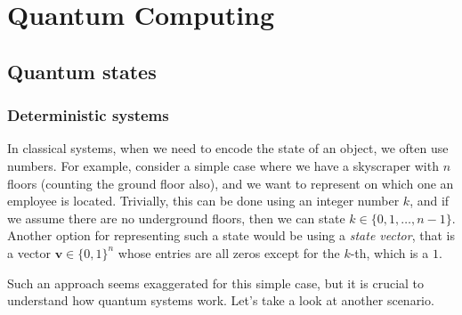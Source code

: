 \documentclass[12pt,a4paper]{report}
\theoremstyle{definition}
\theoremstyle{definition}
\theoremstyle{definition}
\begin{document}
\chapter{Quantum Computing}


\section{Quantum states}
\subsection{Deterministic systems}
In classical systems, when we need to encode the state of an object, we often use numbers. For example, consider a simple case where we have a skyscraper with $n$ floors (counting the ground floor also), and we want to represent on which one an employee is located. Trivially, this can be done using an integer number $k$, and if we assume there are no underground floors, then we can state $k \in \{0, 1, \ldots, n-1\}$.\\
Another option for representing such a state would be using a \textit{state vector}, that is a vector $\mathbf{v}\in\{0,1\}^n$ whose entries are all zeros except for the $k$-th, which is a $1$.
\begin{center}
\end{center}
Such an approach seems exaggerated for this simple case, but it is crucial to understand how quantum systems work. Let's take a look at another scenario.
\end{document}
